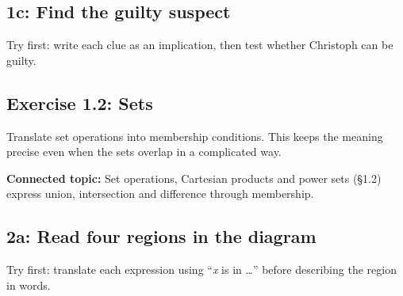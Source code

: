 \documentclass[11pt]{article}
\begin{document}
\begin{keepsection}
\begin{keepsection}
\subsection{1c: Find the guilty suspect}

Try first: write each clue as an implication, then test whether Christoph can be guilty.

\end{keepsection}
\end{keepsection}

\begin{keepsection}
\section{Exercise 1.2: Sets}

Translate set operations into membership conditions. This keeps the meaning precise even when the sets overlap in a complicated way.

\textbf{Connected topic:} Set operations, Cartesian products and power sets (§1.2) express union, intersection and difference through membership.

\begin{keepsection}
\subsection{2a: Read four regions in the diagram}

Try first: translate each expression using “\textit{x} is in …” before describing the region in words.


\end{keepsection}
\end{keepsection}
\end{document}

